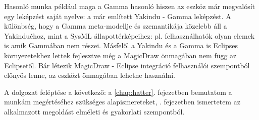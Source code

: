 Hasonló munka például maga a Gamma hasonló hiszen az eszköz már megvalósít egy leképzést saját nyelve: a már említett Yakindu - Gamma leképzést. A különbség, hogy a Gamma meta-modellje és szemantikája közelebb áll a Yakinduéhoz, mint a SysML állapottérképeihez: pl. felhasználhatók olyan elemek is amik Gammában nem részei. Másfelől a Yakindu és a Gamma is Eclipses környezetekhez lettek fejlesztve még a MagicDraw önmagában nem függ az Eclipsetől. Bár létezik MagicDraw - Eclipse integráció felhasználói szempontból előnyös lenne, az eszközt önmagában lehetne használni.

A dolgozat feléptése a következő: a \ref{chap:hatter}. fejezetben bemutatom a munkám megértéséhez szükséges alapismereteket, . fejezetben ismertetem az alkalmazott megoldást elméleti és gyakorlati szempontból.


